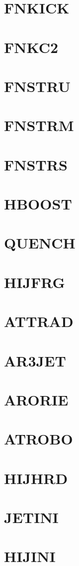 \documentclass[14pt,UTF8]{ctexbook}
\begin{document}
\section{FNKICK}
\section{FNKC2}
\section{FNSTRU}
\section{FNSTRM}
\section{FNSTRS}
\section{HBOOST}
\section{QUENCH}
\section{HIJFRG}
\section{ATTRAD}
\section{AR3JET}
\section{ARORIE}
\section{ATROBO}
\section{HIJHRD}
\section{JETINI}
\section{HIJINI}
\end{document}
